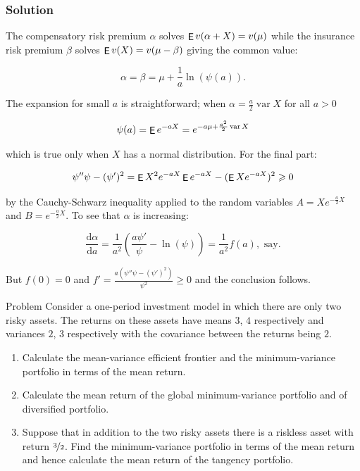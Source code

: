 \documentclass[10pt]{beamer}
\newcommand{\ds}{\displaystyle}
\DeclareMathOperator\expc{{\sf E}}
\DeclareMathOperator\var{var}
\theoremstyle{definition}
\begin{document}
\begin{frame}
  \frametitle{Solution}
  The compensatory risk premium $\alpha$ solves $\expc{v(\alpha + X)} = v(\mu)$ while the insurance risk premium $\beta$ solves $\expc{v(X)} = v(\mu - \beta)$ giving the common value:

\[\alpha = \beta = \mu + \frac{1}{a} \ln (\psi(a)).\]

The expansion for small $a$ is straightforward; when $\alpha = \frac{a}{2}\var{X}$ for all $a > 0$

\[\psi(a) = \expc{e^{-aX}} = e^{-a\mu+\frac{a^2}{2}\var{X}}\]

which is true only when $X$ has a normal distribution. For the final part:

\[\psi''\psi - (\psi')^2 = \expc{X^2e^{-aX}}\expc{e^{-aX}} - (\expc{Xe^{-aX}})^2 \geqslant 0\]

by the Cauchy-Schwarz inequality applied to the random variables $A = Xe^{-\frac{a}{2}X}$ and $B = e^{-\frac{a}{2}X}$. To see that $\alpha$ is increasing:

\[\frac{\text{d}\alpha}{\text{d}a} = \frac{1}{a^2}\left(\frac{a\psi'}{\psi} - \ln (\psi)\right) = \frac{1}{a^2}f(a),\text{ say}.\]

But $f(0) = 0$ and $\ds f' = \frac{a(\psi''\psi - (\psi')^2)}{\psi^2}\geqslant 0$ and the conclusion follows.
\end{frame}

\begin{frame}{Problem}
  Consider a one-period investment model in which there are only two risky assets. The returns on these assets have means $3$, $4$ respectively and variances $2$, $3$ respectively with the covariance between the returns being $2$.
  \begin{enumerate}
    \item Calculate the mean-variance efficient frontier and the minimum-variance portfolio in terms of the mean return.
    \item Calculate the mean return of the global minimum-variance portfolio and of diversified portfolio.
    \item Suppose that in addition to the two risky assets there is a riskless asset with return $\nicefrac{3}{2}$. Find the minimum-variance portfolio in terms of the mean return and hence calculate the mean return of the tangency portfolio.
  \end{enumerate}
\end{frame}
\end{document}
